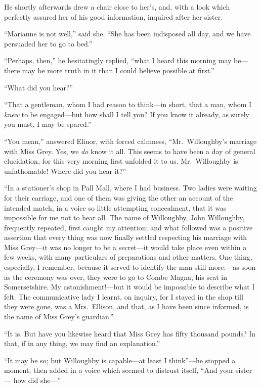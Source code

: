 \documentclass{article}
\begin{document}
He shortly afterwards drew a chair close to her's,
and, with a look which perfectly assured her of his
good information, inquired after her sister.

``Marianne is not well,'' said she.  ``She has been
indisposed all day, and we have persuaded her to go to bed.''

``Perhaps, then,'' he hesitatingly replied, ``what I
heard this morning may be---there may be more truth in it
than I could believe possible at first.''

``What did you hear?''

``That a gentleman, whom I had reason to think---in short,
that a man, whom I \emph{knew} to be engaged---but how shall I
tell you?  If you know it already, as surely you must,
I may be spared.''

``You mean,'' answered Elinor, with forced calmness,
``Mr.\ Willoughby's marriage with Miss Grey.  Yes, we \emph{do}
know it all.  This seems to have been a day of general
elucidation, for this very morning first unfolded it to us.
Mr.\ Willoughby is unfathomable!  Where did you hear it?''

``In a stationer's shop in Pall Mall, where I
had business.  Two ladies were waiting for their carriage,
and one of them was giving the other an account of the
intended match, in a voice so little attempting concealment,
that it was impossible for me not to hear all.  The name
of Willoughby, John Willoughby, frequently repeated,
first caught my attention; and what followed was a positive
assertion that every thing was now finally settled
respecting his marriage with Miss Grey---it was no longer
to be a secret---it would take place even within a few weeks,
with many particulars of preparations and other matters.
One thing, especially, I remember, because it served
to identify the man still more:---as soon as the ceremony
was over, they were to go to Combe Magna, his seat
in Somersetshire.  My astonishment!---but it would be
impossible to describe what I felt.  The communicative
lady I learnt, on inquiry, for I stayed in the shop
till they were gone, was a Mrs.\ Ellison, and that, as I
have been since informed, is the name of Miss Grey's guardian.''

``It is.  But have you likewise heard that Miss Grey
has fifty thousand pounds?  In that, if in any thing,
we may find an explanation.''

``It may be so; but Willoughby is capable---at least
I think''---he stopped a moment; then added in a voice
which seemed to distrust itself, ``And your sister---%
how did she---''
\end{document}
